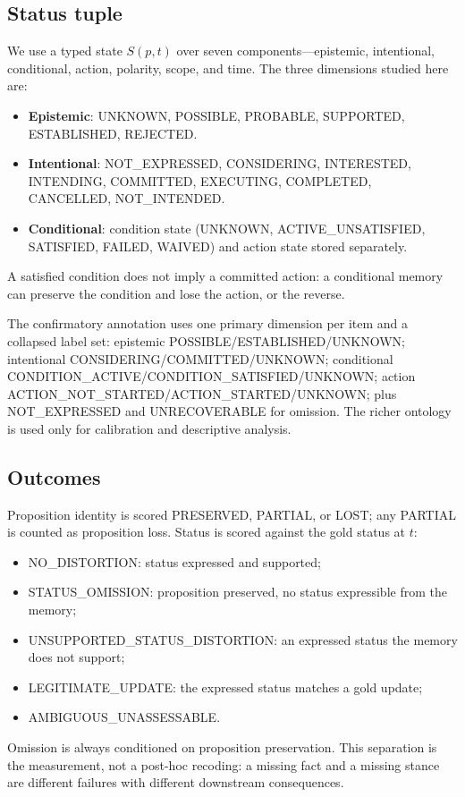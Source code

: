\documentclass[11pt]{article}
\newcommand{\st}[1]{\textsc{#1}}
\begin{document}
\subsection{Status tuple}

We use a typed state $S(p,t)$ over seven components---epistemic,
intentional, conditional, action, polarity, scope, and time. The three
dimensions studied here are:
\begin{itemize}
\item \textbf{Epistemic}: \st{UNKNOWN}, \st{POSSIBLE}, \st{PROBABLE},
  \st{SUPPORTED}, \st{ESTABLISHED}, \st{REJECTED}.
\item \textbf{Intentional}: \st{NOT\_EXPRESSED}, \st{CONSIDERING},
  \st{INTERESTED}, \st{INTENDING}, \st{COMMITTED}, \st{EXECUTING},
  \st{COMPLETED}, \st{CANCELLED}, \st{NOT\_INTENDED}.
\item \textbf{Conditional}: condition state (\st{UNKNOWN},
  \st{ACTIVE\_UNSATISFIED}, \st{SATISFIED}, \st{FAILED}, \st{WAIVED}) and action
  state stored separately.
\end{itemize}
A satisfied condition does not imply a committed action: a conditional memory can
preserve the condition and lose the action, or the reverse.

The confirmatory annotation uses one primary dimension per item and a collapsed
label set: epistemic \st{POSSIBLE}/\allowbreak\st{ESTABLISHED}/\allowbreak\st{UNKNOWN}; intentional
\st{CONSIDERING}/\allowbreak\st{COMMITTED}/\allowbreak\st{UNKNOWN}; conditional
\st{CONDITION\_ACTIVE}/\allowbreak\st{CONDITION\_SATISFIED}/\allowbreak\st{UNKNOWN}; action
\st{ACTION\_NOT\_STARTED}/\allowbreak\st{ACTION\_STARTED}/\allowbreak\st{UNKNOWN}; plus
\st{NOT\_EXPRESSED} and \st{UNRECOVERABLE} for omission. The richer ontology is
used only for calibration and descriptive analysis.

\subsection{Outcomes}

Proposition identity is scored \st{PRESERVED}, \st{PARTIAL}, or \st{LOST}; any
\st{PARTIAL} is counted as proposition loss. Status is scored against the gold
status at $t$:
\begin{itemize}
\item \st{NO\_DISTORTION}: status expressed and supported;
\item \st{STATUS\_OMISSION}: proposition preserved, no status expressible from
  the memory;
\item \st{UNSUPPORTED\_STATUS\_\-DISTORTION}: an expressed status the memory does
  not support;
\item \st{LEGITIMATE\_UPDATE}: the expressed status matches a gold update;
\item \st{AMBIGUOUS\_UNASSESSABLE}.
\end{itemize}
Omission is always conditioned on proposition preservation. This separation is
the measurement, not a post-hoc recoding: a missing fact and a missing stance
are different failures with different downstream consequences.
\end{document}
